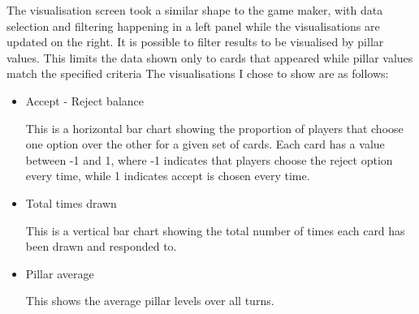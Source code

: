 The visualisation screen took a similar shape to the game maker, with data selection and filtering happening in a left panel while the visualisations are updated on the right.
It is possible to filter results to be visualised by pillar values. This limits the data shown only to cards that appeared while pillar values match the specified criteria The visualisations I chose to show are as follows:
\begin{itemize}
    \item Accept - Reject balance

    This is a horizontal bar chart showing the proportion of players that choose one option over the other for a given set of cards. Each card has a value between -1 and 1, where -1 indicates that players choose the reject option every time, while 1 indicates accept is chosen every time.
    \item Total times drawn
    
    This is a vertical bar chart showing the total number of times each card has been drawn and responded to.
    \item Pillar average

    This shows the average pillar levels over all turns.
\end{itemize}